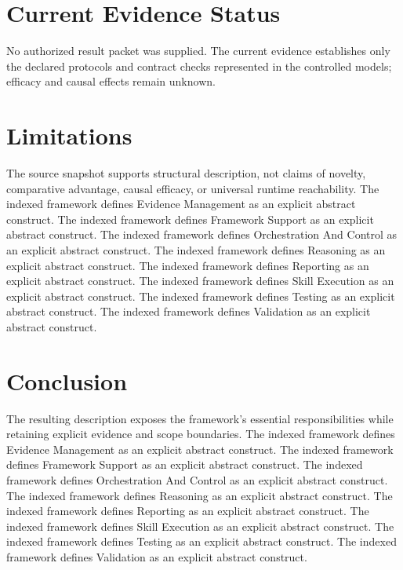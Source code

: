 \documentclass[11pt]{article}
\begin{document}
\section{Current Evidence Status}

No authorized result packet was supplied. The current evidence establishes only the declared protocols and contract checks represented in the controlled models; efficacy and causal effects remain unknown.

\section{Limitations}

The source snapshot supports structural description, not claims of novelty, comparative advantage, causal efficacy, or universal runtime reachability. The indexed framework defines Evidence Management as an explicit abstract construct. The indexed framework defines Framework Support as an explicit abstract construct. The indexed framework defines Orchestration And Control as an explicit abstract construct. The indexed framework defines Reasoning as an explicit abstract construct. The indexed framework defines Reporting as an explicit abstract construct. The indexed framework defines Skill Execution as an explicit abstract construct. The indexed framework defines Testing as an explicit abstract construct. The indexed framework defines Validation as an explicit abstract construct.

\section{Conclusion}

The resulting description exposes the framework's essential responsibilities while retaining explicit evidence and scope boundaries. The indexed framework defines Evidence Management as an explicit abstract construct. The indexed framework defines Framework Support as an explicit abstract construct. The indexed framework defines Orchestration And Control as an explicit abstract construct. The indexed framework defines Reasoning as an explicit abstract construct. The indexed framework defines Reporting as an explicit abstract construct. The indexed framework defines Skill Execution as an explicit abstract construct. The indexed framework defines Testing as an explicit abstract construct. The indexed framework defines Validation as an explicit abstract construct.
\end{document}
